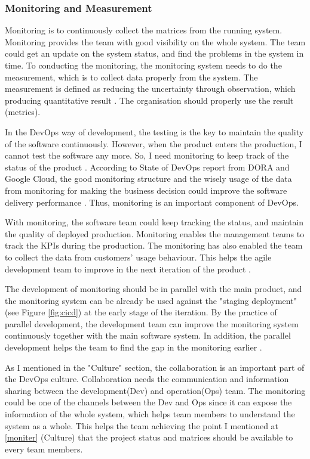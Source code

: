 \subsubsection[]{Monitoring and Measurement}
Monitoring is to continuously collect the matrices from the running system. Monitoring provides the team with good visibility on the whole system. The team could get an update on the system status, and find the problems in the system in time. To conducting the monitoring, the monitoring system needs to do the measurement, which is to collect data properly from the system. The measurement is defined as reducing the uncertainty through observation, which producing quantitative result \cite{hering2015measure}. The organisation should properly use the result (metrics).
\par
In the DevOps way of development, the testing is the key to maintain the quality of the software continuously. However, when the product enters the production, I cannot test the software any more. So, I need monitoring to keep track of the status of the product \cite{huttermann2012devops}. According to State of DevOps report from DORA and Google Cloud, the good monitoring structure and the wisely usage of the data from monitoring for making the business decision could improve the software delivery performance \cite{forsgrenaccelerate}. Thus, monitoring is an important component of DevOps.
\par
With monitoring, the software team could keep tracking the status, and maintain the quality of deployed production. Monitoring enables the management teams to track the KPIs during the production. The monitoring has also enabled the team to collect the data from customers' usage behaviour. This helps the agile development team to improve in the next iteration of the product \cite{lwakatare2015dimensions}.
\par
The development of monitoring should be in parallel with the main product, and the monitoring system can be already be used against the "staging deployment" (see Figure \ref{fig:cicd}) at the early stage of the iteration. By the practice of parallel development, the development team can improve the monitoring system continuously together with the main software system. In addition, the parallel development helps the team to find the gap in the monitoring earlier \cite{huttermann2012devops}.
\par
As I mentioned in the "Culture" section, the collaboration is an important part of the DevOps culture. Collaboration needs the communication and information sharing between the development(Dev) and operation(Ops) team. The monitoring could be one of the channels between the Dev and Ops since it can expose the information of the whole system, which helps team members to understand the system as a whole. This helps the team achieving the point I mentioned at \ref{moniter} (Culture) that the project status and matrices should be available to every team members.
